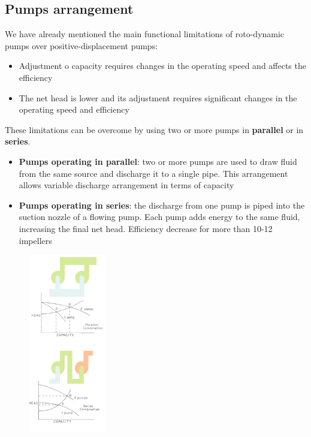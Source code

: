 \documentclass[class=report, crop=false, 12pt,a4paper]{standalone}
\begin{document}
\subsection{Pumps arrangement}
We have already mentioned the main functional limitations of roto-dynamic pumps over positive-displacement pumps:
\begin{itemize}
  \item Adjustment o capacity requires changes in the operating speed and affects the efficiency
  \item The net head is lower and its adjustment requires significant changes in the operating speed and efficiency
\end{itemize}
These limitations can be overcome by using two or more pumps in \textbf{parallel} or in \textbf{series}.
\begin{itemize}
  \item \textbf{Pumps operating in parallel}: two or more pumps are used to draw fluid from the same source and discharge it to a single pipe. This arrangement allows variable discharge arrangement in terms of capacity
  \item \textbf{Pumps operating in series}: the discharge from one pump is piped into the suction nozzle of a flowing pump. Each pump adds energy to the same fluid, increasing the final net head. Efficiency decrease for more than 10-12 impellers
\end{itemize}
\begin{figure}[H]
  \centering
  \includegraphics[width = 0.3\textwidth]{../img/diagram2.png}
\end{figure}
\end{document}
